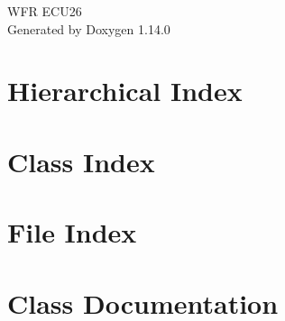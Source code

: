 \documentclass[twoside]{book}
\newcommand{\+}{\discretionary{\mbox{\scriptsize$\hookleftarrow$}}{}{}}
\newcommand{\clearemptydoublepage}{%
    \newpage{\pagestyle{empty}\cleardoublepage}%
  }
\begin{document}
  \raggedbottom
    \hypersetup{pageanchor=false,
                bookmarksnumbered=true,
                pdfencoding=unicode
               }
  \begin{titlepage}
  \vspace*{7cm}
  \begin{center}%
  {\Large WFR ECU26}\\
  \vspace*{1cm}
  {\large Generated by Doxygen 1.14.0}\\
  \end{center}
  \end{titlepage}
  \clearemptydoublepage
  \tableofcontents
  \clearemptydoublepage
  \hypersetup{pageanchor=true}

\chapter{Hierarchical Index}

\chapter{Class Index}

\chapter{File Index}

\chapter{Class Documentation}





















\end{document}
